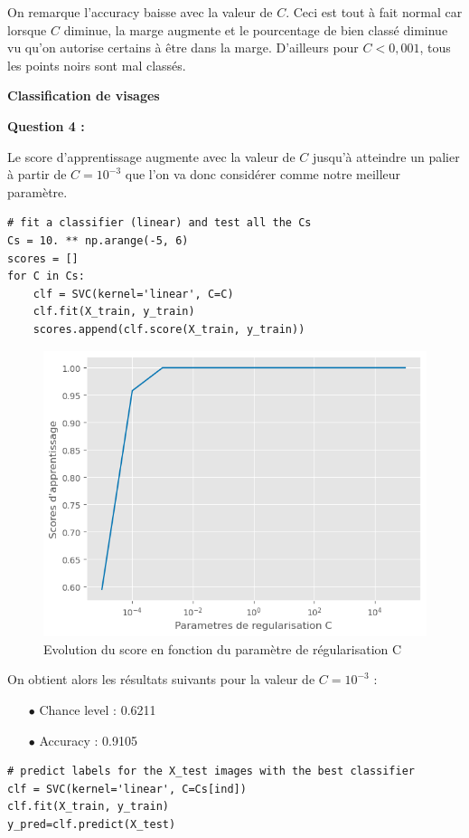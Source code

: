 \documentclass[10pt,a4paper]{article}
\begin{document}
On remarque l'accuracy baisse avec la valeur de $C$. Ceci est tout à fait normal car lorsque $C$ diminue, la marge augmente et le pourcentage de bien classé diminue vu qu'on autorise certains à être dans la marge. D'ailleurs pour $C<0,001$, tous les points noirs sont mal classés.
\bigskip

\begin{large}
\textbf{Classification de visages}
\end{large}


\textbf{Question 4 :}

Le score d'apprentissage augmente avec la valeur de $C$ jusqu'à atteindre un palier à partir de $C=10^{-3}$ que l'on va donc considérer comme notre meilleur paramètre.

\begin{lstlisting}
# fit a classifier (linear) and test all the Cs
Cs = 10. ** np.arange(-5, 6)
scores = []
for C in Cs:
    clf = SVC(kernel='linear', C=C)
    clf.fit(X_train, y_train)
    scores.append(clf.score(X_train, y_train))
\end{lstlisting}

\begin{figure}[H]
\centerline{\includegraphics[width=0.6\linewidth]{images/score_vs_C.png}}
\caption{Evolution du score en fonction du paramètre de régularisation C}
\label{fig:sc_vs_c}
\end{figure}

On obtient alors les résultats suivants pour la valeur de $C=10^{-3}$ : 

\begin{itemize}
\item[$\bullet$] Chance level : 0.6211
\item[$\bullet$] Accuracy : 0.9105
\end{itemize}

\begin{lstlisting}
# predict labels for the X_test images with the best classifier
clf = SVC(kernel='linear', C=Cs[ind])
clf.fit(X_train, y_train)
y_pred=clf.predict(X_test)
\end{lstlisting}
\end{document}
